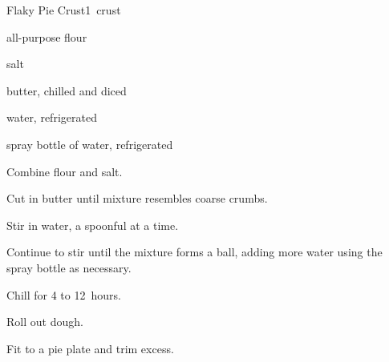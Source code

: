 \begin{recipe}{Flaky Pie Crust}{}{1~crust}

\begin{ingredients}
\item \C{1\quarter} all-purpose flour
\item \tp{\quarter} salt
\item \C{\half} butter, chilled and diced
\item \C{\quarter} water, refrigerated
\item spray bottle of water, refrigerated
\end{ingredients}

\begin{directions}
\item Combine flour and salt.
\item Cut in butter until mixture resembles coarse crumbs.
\item Stir in water, a spoonful at a time.
\item Continue to stir until the mixture forms a ball, adding more water using the spray bottle as necessary.
\item Chill for 4 to 12~hours.
\item Roll out dough.
\item Fit to a pie plate and trim excess.
\end{directions}

\end{recipe}
